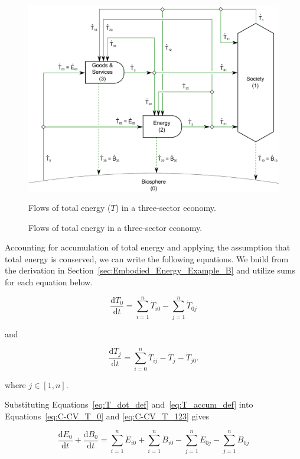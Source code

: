 \begin{figure}[!ht]
\includegraphics[width=1.0\linewidth]{Part_1/Chapter_Embodied/images/3_sector_embodied_energy.pdf}
\caption{Flows of total energy in a three-sector economy.}{Flows of total energy ($\dot{T}$) in a three-sector economy.}
\label{fig:C_total_energy}
\end{figure}

Accounting for accumulation of total energy and 
applying the assumption that total energy is conserved, 
we can write the following equations.
We build from the derivation in Section~\ref{sec:Embodied_Energy_Example_B}
and utilize sums for each equation below.

\begin{equation} \label{eq:C-CV_T_0}
	\frac{\mathrm{d}T_{0}}{\mathrm{d}t} 	 
	= \sum\limits_{i=1}^{n} \dot{T}_{i0}
	- \sum\limits_{j=1}^{n} \dot{T}_{0j}
\end{equation}

\noindent and

\begin{equation} \label{eq:C-CV_T_123}
	\frac{\mathrm{d}T_{j}}{\mathrm{d}t} 	 
	= \sum\limits_{i=0}^{n} \dot{T}_{ij}
	- \dot{T}_{j}
	- \dot{T}_{j0}.
\end{equation}

\noindent where $j \in [1, n]$.

Substituting Equations~\ref{eq:T_dot_def} 
and~\ref{eq:T_accum_def} into 
Equations~\ref{eq:C-CV_T_0} and
\ref{eq:C-CV_T_123} gives

\begin{equation} \label{eq:C-CV_dB_0}
	\frac{\mathrm{d}E_{0}}{\mathrm{d}t}
	+ \frac{\mathrm{d}B_{0}}{\mathrm{d}t} 	 
	= \sum\limits_{i=1}^{n} \dot{E}_{i0}
	+ \sum\limits_{i=1}^{n} \dot{B}_{i0}
	- \sum\limits_{j=1}^{n} \dot{E}_{0j}
	- \sum\limits_{j=1}^{n} \dot{B}_{0j}
\end{equation}

